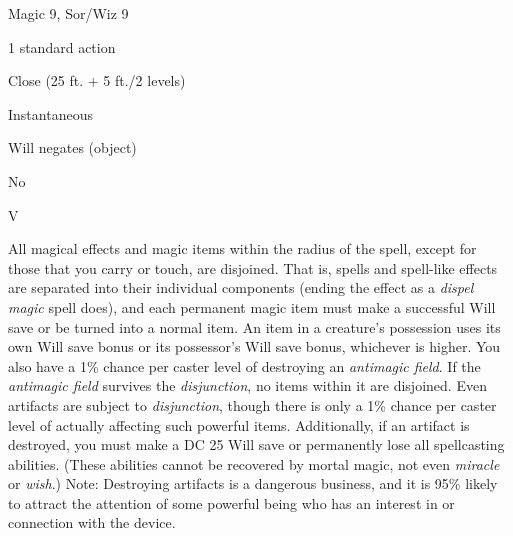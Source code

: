 
\begin{description*}
\item[Level:] Magic 9, Sor/Wiz 9
\item[Casting Time:] 1 standard action
\item[Range:] Close (25 ft. + 5 ft./2 levels)
\item[Duration:] Instantaneous
\item[Saving Throw:] Will negates (object)
\item[Spell Resistance:] No
\item[Components:] V
\end{description*}

All magical effects and magic items within the radius of the spell, except for
those that you carry or touch, are disjoined. That is, spells and spell-like effects
are separated into their individual components (ending the effect as a \textit{dispel
magic} spell does), and each permanent magic item must make a successful Will save
or be turned into a normal item. An item in a creature's possession uses its own
Will save bonus or its possessor's Will save bonus, whichever is higher.
You also have a 1\% chance per caster level of destroying an \textit{antimagic
field}. If the \textit{antimagic field} survives the \textit{disjunction}, no items
within it are disjoined.
Even artifacts are subject to \textit{disjunction}, though there is only a 1\%
chance per caster level of actually affecting such powerful items. Additionally,
if an artifact is destroyed, you must make a DC 25 Will save or permanently lose
all spellcasting abilities. (These abilities cannot be recovered by mortal magic,
not even \textit{miracle} or \textit{wish}.)
Note: Destroying artifacts is a dangerous business, and it is 95\% likely
to attract the attention of some powerful being who has an interest in or connection
with the device.